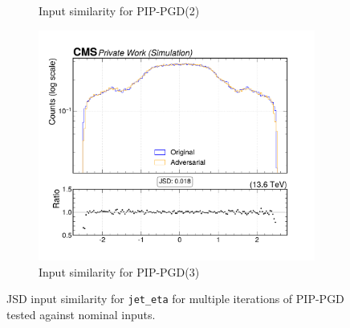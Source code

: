 \begin{figure}[htbp]
\begin{subfigure}[t]{0.32\textwidth}
    \caption*{Input similarity for PIP-PGD(2)}
  \end{subfigure}\hfill
  \begin{subfigure}[t]{0.32\textwidth}
    \includegraphics[width=\linewidth]{media/output/features/compare/combined_it_3/cmp_global_features_jet_eta.pdf}
    \caption*{Input similarity for PIP-PGD(3)}
  \end{subfigure}

  \caption*{JSD input similarity for \texttt{jet\_eta} for multiple iterations of PIP-PGD tested against nominal inputs.}
  \label{fig:combined_input_jet_eta}
\end{figure}

